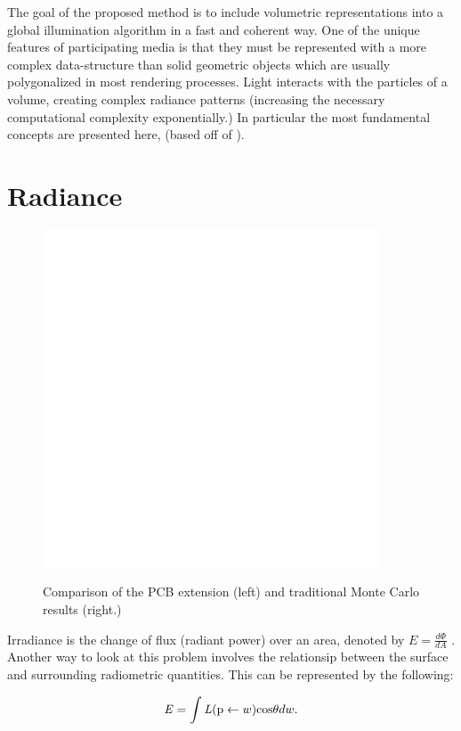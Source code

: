 \documentclass[12pt]{ucthesis}
\newcommand{\captionfonts}{\small\bf\ssp}
\begin{document}
The goal of the proposed method is to include volumetric representations into a global illumination algorithm in a fast and coherent way. One of the unique features of participating media is that they must be represented with a more complex data-structure than solid geometric objects which are usually polygonalized in most rendering processes.  Light interacts with the particles of a volume, creating complex radiance patterns (increasing the necessary computational complexity exponentially.) In particular the most fundamental concepts are presented here,  (based off of  \cite{pbrt}).



\section{Radiance}

\begin{figure}[h!]
    \centering
    \includegraphics[width=100mm]{img/diag/radiance.pdf}
    \captionfonts
    \caption{Comparison of the PCB extension (left) and traditional Monte Carlo results (right.)}
    \label{fig:radiance}
\end{figure}

Irradiance is the change of flux (radiant power) over an area, denoted by $E = \frac{d\Phi}{dA}$ \cite{aga}. Another way to look at this problem involves the relationsip between the surface and surrounding radiometric quantities.  This can be represented by the following:

\begin{equation}
\mathit{E} = \int\mathit{L}(\textup{p} \leftarrow w)\textup{cos}\theta dw.
\label{irradiance}
\end{equation}
\end{document}
